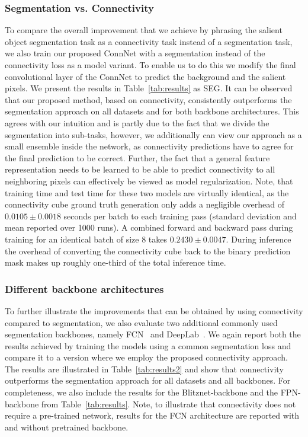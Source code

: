 \documentclass[journal]{IEEEtran}
\begin{document}
\subsubsection{Segmentation vs. Connectivity}
\label{sec:segVsConn}
To compare the overall improvement that we achieve by phrasing the salient object segmentation task as a connectivity task instead of a segmentation task, we also train our proposed ConnNet with a segmentation instead of the connectivity loss as a model variant. To enable us to do this we modify the final convolutional layer of the ConnNet to predict the background and the salient pixels. We present the results in Table~\ref{tab:results} as SEG. 
It can be observed that our proposed method, based on connectivity, consistently outperforms the segmentation approach on all datasets and for both backbone architectures. This agrees with our intuition and is partly due to the fact that we divide the segmentation into sub-tasks, however, we additionally can view our approach as a small ensemble inside the network, as connectivity predictions have to agree for the final prediction to be correct. Further, the fact that a general feature representation needs to be learned to be able to predict connectivity to all neighboring pixels can effectively be viewed as model regularization. Note, that training time and test time for these two models are virtually identical, as the connectivity cube ground truth generation only adds a negligible overhead of $0.0105 \pm 0.0018$ seconds per batch to each training pass (standard deviation and mean reported over 1000 runs). A combined forward and backward pass during training for an identical batch of size 8 takes $0.2430 \pm 0.0047$. During inference the overhead of converting the connectivity cube back to the binary prediction mask makes up roughly one-third of the total inference time.

\subsubsection{Different backbone architectures}
To further illustrate the improvements that can be obtained by using connectivity compared to segmentation, we also evaluate two additional commonly used segmentation backbones, namely FCN~\cite{long2015fully} and DeepLab~\cite{chen2016deeplab}. We again report both the results achieved by training the models using a common segmentation loss and compare it to a version where we employ the proposed connectivity approach. The results are illustrated in Table~\ref{tab:results2} and show that connectivity outperforms the segmentation approach for all datasets and all backbones. For completeness, we also include the results for the Blitznet-backbone and the FPN-backbone from Table~\ref{tab:results}. Note, to illustrate that connectivity does not require a pre-trained network, results for the FCN architecture are reported with and without pretrained backbone.
\end{document}
